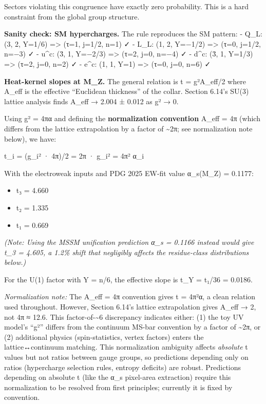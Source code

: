 \documentclass[11pt,a4paper]{article}
\theoremstyle{remark}
\providecommand{\tightlist}{%
  \setlength{\itemsep}{0pt}\setlength{\parskip}{0pt}}
\begin{document}
Sectors violating this congruence have exactly zero probability. This is a
hard constraint from the global group structure.

\textbf{Sanity check: SM hypercharges.} The rule reproduces the SM pattern:
- Q\_L: (3, 2, Y=1/6) =\textgreater{} (τ=1, j=1/2, n=1) ✓
- L\_L: (1, 2, Y=−1/2) =\textgreater{} (τ=0, j=1/2, n=−3) ✓
- u\^{}c: (3̄, 1, Y=−2/3) =\textgreater{} (τ=2, j=0, n=−4) ✓
- d\^{}c: (3̄, 1, Y=1/3) =\textgreater{} (τ=2, j=0, n=2) ✓
- e\^{}c: (1, 1, Y=1) =\textgreater{} (τ=0, j=0, n=6) ✓

\textbf{Heat-kernel slopes at M\_Z.} The general relation is t = g²A\_eff/2 where
A\_eff is the effective ``Euclidean thickness'' of the collar. Section 6.14's
SU(3) lattice analysis finds A\_eff → 2.004 ± 0.012 as g² → 0.

Using g² = 4πα and defining the \textbf{normalization convention} A\_eff = 4π
(which differs from the lattice extrapolation by a factor of \textasciitilde2π; see
normalization note below), we have:

t\_i = (g\_i² · 4π)/2 = 2π · g\_i² = 4π² α\_i

With the electroweak inputs and PDG 2025 EW-fit value α\_s(M\_Z) = 0.1177:

\begin{itemize}
\tightlist
\item
  t₃ = 4.660
\item
  t₂ = 1.335
\item
  t₁ = 0.669
\end{itemize}

\emph{(Note: Using the MSSM unification prediction α\_s = 0.1166 instead would give
t\_3 = 4.605, a 1.2\% shift that negligibly affects the residue-class distributions
below.)}

For the U(1) factor with Y = n/6, the effective slope is t\_Y = t₁/36 = 0.0186.

\emph{Normalization note:} The A\_eff = 4π convention gives t = 4π²α, a clean
relation used throughout. However, Section 6.14's lattice extrapolation
gives A\_eff → 2, not 4π ≈ 12.6. This factor-of-\textasciitilde6 discrepancy indicates
either: (1) the toy UV model's ``g²'' differs from the continuum MS-bar
convention by a factor of \textasciitilde2π, or (2) additional physics (spin-statistics,
vertex factors) enters the lattice↔continuum matching. This normalization
ambiguity affects \emph{absolute} t values but not ratios between gauge groups,
so predictions depending only on ratios (hypercharge selection rules,
entropy deficits) are robust. Predictions depending on absolute t (like
the α\_s pixel-area extraction) require this normalization to be resolved
from first principles; currently it is fixed by convention.
\end{document}
